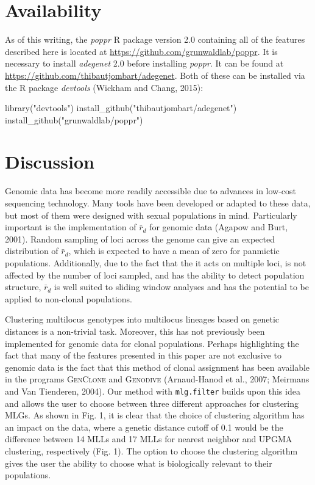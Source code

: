 \documentclass{frontiersSCNS} %
\newenvironment{CodeChunk}{}{}
\begin{document}
\section*{Availability}\label{availability}

As of this writing, the \emph{poppr} R package version 2.0 containing
all of the features described here is located at
\url{https://github.com/grunwaldlab/poppr}. It is necessary to install
\emph{adegenet} 2.0 before installing \emph{poppr}. It can be found at
\url{https://github.com/thibautjombart/adegenet}. Both of these can be
installed via the R package \emph{devtools} (Wickham and Chang, 2015):

\begin{CodeChunk}
\begin{CodeInput}
library("devtools")
install_github("thibautjombart/adegenet")
install_github("grunwaldlab/poppr")
\end{CodeInput}
\end{CodeChunk}

\section*{Discussion}\label{discussion}

Genomic data has become more readily accessible due to advances in
low-cost sequencing technology. Many tools have been developed or
adapted to these data, but most of them were designed with sexual
populations in mind. Particularly important is the implementation of
\(\bar{r}_d\) for genomic data (Agapow and Burt, 2001). Random sampling
of loci across the genome can give an expected distribution of
\(\bar{r}_d\), which is expected to have a mean of zero for panmictic
populations. Additionally, due to the fact that the it acts on multiple
loci, is not affected by the number of loci sampled, and has the ability
to detect population structure, \(\bar{r}_d\) is well suited to sliding
window analyses and has the potential to be applied to non-clonal
populations.

Clustering multilocus genotypes into multilocus lineages based on
genetic distances is a non-trivial task. Moreover, this has not
previously been implemented for genomic data for clonal populations.
Perhaps highlighting the fact that many of the features presented in
this paper are not exclusive to genomic data is the fact that this
method of clonal assignment has been available in the programs
\textsc{GenClone} and \textsc{Genodive} (Arnaud-Hanod et al., 2007;
Meirmans and Van Tienderen, 2004). Our method with \texttt{mlg.filter}
builds upon this idea and allows the user to choose between three
different approaches for clustering MLGs. As shown in Fig. 1, it is
clear that the choice of clustering algorithm has an impact on the data,
where a genetic distance cutoff of 0.1 would be the difference between
14 MLLs and 17 MLLs for nearest neighbor and UPGMA clustering,
respectively (Fig. 1). The option to choose the clustering algorithm
gives the user the ability to choose what is biologically relevant to
their populations.
\end{document}
